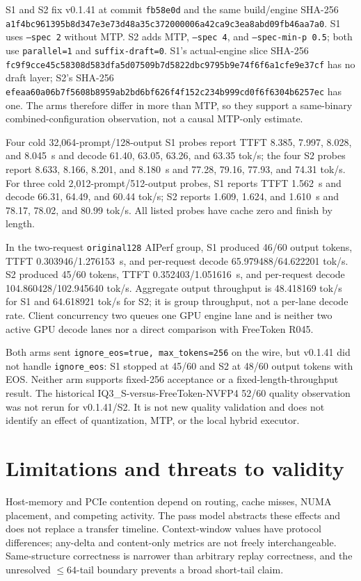 \documentclass[11pt]{article}
\begin{document}
S1 and S2 fix v0.1.41 at commit \texttt{fb58e0d} and the same build/engine SHA-256 \texttt{a1f4bc961395b8d347e3e73d48a35c372000006a42ca9c3ea8abd09fb46aa7a0}. S1 uses \texttt{--spec 2} without MTP. S2 adds MTP, \texttt{--spec 4}, and \texttt{--spec-min-p 0.5}; both use \texttt{parallel=1} and \texttt{suffix-draft=0}. S1's actual-engine slice SHA-256 \texttt{fc9f9cce45c58308d583dfa5d07509b7d5822dbc9795b9e74f6f6a1cfe9e37cf} has no draft layer; S2's SHA-256 \texttt{efeaa60a06b7f5608b8959ab2bd6bf626f4f152c234b999cd0f6f6304b6257ec} has one. The arms therefore differ in more than MTP, so they support a same-binary combined-configuration observation, not a causal MTP-only estimate.

Four cold 32,064-prompt/128-output S1 probes report TTFT 8.385, 7.997, 8.028, and 8.045~s and decode 61.40, 63.05, 63.26, and 63.35 tok/s; the four S2 probes report 8.633, 8.166, 8.201, and 8.180~s and 77.28, 79.16, 77.93, and 74.31 tok/s. For three cold 2,012-prompt/512-output probes, S1 reports TTFT 1.562~s and decode 66.31, 64.49, and 60.44 tok/s; S2 reports 1.609, 1.624, and 1.610~s and 78.17, 78.02, and 80.99 tok/s. All listed probes have cache zero and finish by length.

In the two-request \texttt{original128} AIPerf group, S1 produced 46/60 output tokens, TTFT 0.303946/1.276153~s, and per-request decode 65.979488/64.622201 tok/s. S2 produced 45/60 tokens, TTFT 0.352403/1.051616~s, and per-request decode 104.860428/102.945640 tok/s. Aggregate output throughput is 48.418169 tok/s for S1 and 64.618921 tok/s for S2; it is group throughput, not a per-lane decode rate. Client concurrency two queues one GPU engine lane and is neither two active GPU decode lanes nor a direct comparison with FreeToken R045.

Both arms sent \texttt{ignore\_eos=true, max\_tokens=256} on the wire, but v0.1.41 did not handle \texttt{ignore\_eos}: S1 stopped at 45/60 and S2 at 48/60 output tokens with EOS. Neither arm supports fixed-256 acceptance or a fixed-length-throughput result. The historical IQ3\_S-versus-FreeToken-NVFP4 52/60 quality observation was not rerun for v0.1.41/S2. It is not new quality validation and does not identify an effect of quantization, MTP, or the local hybrid executor.

\section{Limitations and threats to validity}

Host-memory and PCIe contention depend on routing, cache misses, NUMA placement, and competing activity. The pass model abstracts these effects and does not replace a transfer timeline. Context-window values have protocol differences; any-delta and content-only metrics are not freely interchangeable. Same-structure correctness is narrower than arbitrary replay correctness, and the unresolved $\leq64$-tail boundary prevents a broad short-tail claim.
\end{document}
